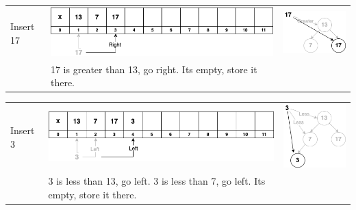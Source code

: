 \begin{center}
\begin{tabular}{|M{0.10\textwidth}|M{0.50\textwidth} M{0.35\textwidth}|}
\hline
Insert 17 &
\includegraphics[scale=.4]{images/binary_tree_array_03a.png} & 
\includegraphics[scale=.4]{images/binary_tree_example_03.png}\\
& \footnotesize{17 is greater than 13, go right. Its empty, store it there.} &   \\
\hline
\end{tabular}
\end{center}
\begin{center}
\begin{tabular}{|M{0.10\textwidth}|M{0.50\textwidth} M{0.35\textwidth}|}
\hline
Insert 3 &
\includegraphics[scale=.4]{images/binary_tree_array_04a.png} & 
\includegraphics[scale=.4]{images/binary_tree_example_04.png}\\
& \footnotesize{3 is less than 13, go left. 3 is less than 7, go left. Its empty, store it there.} &   \\
\hline
\end{tabular}
\end{center}
